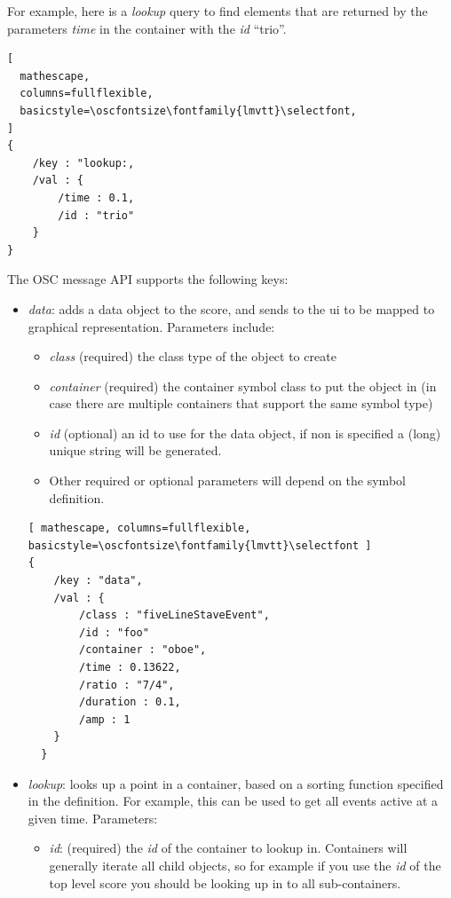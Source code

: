\documentclass{article}
\def\oscfontsize{\footnotesize}
\begin{document}
For example, here is a \textit{lookup} query to find elements that are returned by the parameters \textit{time} in the container with the \textit{id} ``trio''.


\begin{lstlisting}[
  mathescape,
  columns=fullflexible,
  basicstyle=\oscfontsize\fontfamily{lmvtt}\selectfont,
]
{
    /key : "lookup:,
    /val : {
        /time : 0.1,
        /id : "trio"
    }
}

\end{lstlisting}

The OSC message API supports the following keys:
\begin{itemize}\itemsep0pt 
\item \textit{data}: adds a data object to the score, and sends to the ui to be mapped to graphical representation. Parameters include:
\begin{itemize}\itemsep0pt 
  \item \textit{class} (required) the class type of the object to create
  \item \textit{container} (required) the container symbol class to put the object in (in case there are multiple containers that support the same symbol type)
  \item \textit{id} (optional) an id to use for the data object, if non is specified a (long) unique string will be generated.
  \item Other required or optional parameters will depend on the symbol definition.
\end{itemize}

\begin{lstlisting}[ mathescape, columns=fullflexible, basicstyle=\oscfontsize\fontfamily{lmvtt}\selectfont ]
{
    /key : "data",
    /val : {
        /class : "fiveLineStaveEvent",
        /id : "foo"
        /container : "oboe",
        /time : 0.13622,
        /ratio : "7/4",
        /duration : 0.1,
        /amp : 1
    }
  }
\end{lstlisting}


\item \textit{lookup}: looks up a point in a container, based on a sorting function specified in the definition. For example, this can be used to get all events active at a given time. Parameters:

\begin{itemize}\itemsep0pt 
  \item \textit{id}: (required) the \textit{id} of the container to lookup in. Containers will generally iterate all child objects, so for example if you use the \textit{id} of the top level score you should be looking up in to all sub-containers.
  \end{itemize}
  

\end{itemize}
\end{document}
